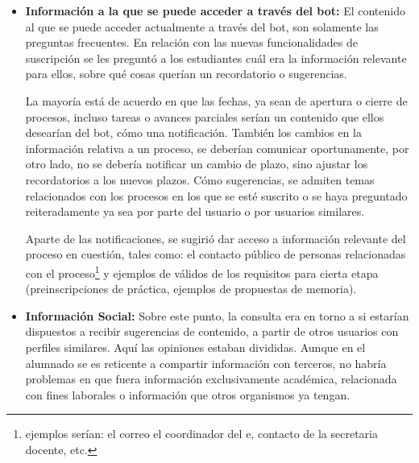    \begin{itemize}
        \item \textbf{Información a la que se puede acceder a través del bot:} El contenido al que se puede acceder actualmente a través del bot, son solamente las preguntas frecuentes. En relación con las nuevas funcionalidades de suscripción se les preguntó a los estudiantes cuál era la información relevante para ellos, sobre qué cosas querían un recordatorio o sugerencias.
        \par La mayoría está de acuerdo en que las fechas, ya sean de apertura o cierre de procesos, incluso tareas o avances parciales serían un contenido que ellos desearían del bot, cómo una notificación. También los cambios en la información relativa a un proceso, se deberían comunicar oportunamente, por otro lado, no se debería notificar un cambio de plazo, sino ajustar los recordatorios a los nuevos plazos. Cómo sugerencias, se admiten temas relacionados con los procesos en los que se esté suscrito o se haya preguntado reiteradamente ya sea por parte del usuario o por usuarios \guillemotleft similares\guillemotright.
        \par Aparte de las notificaciones, se sugirió dar acceso a información relevante del proceso en cuestión, tales como: el contacto público de personas relacionadas con el proceso\footnote{ejemplos serían: el correo el coordinador del \acrshort{e}, contacto de la secretaria docente, etc.} y ejemplos de válidos de los requisitos para cierta etapa (preinscripciones de práctica, ejemplos de propuestas de memoria).

        \item \textbf{Información Social:} Sobre este punto, la consulta era en torno a si estarían dispuestos a recibir sugerencias de contenido, a partir de otros usuarios con perfiles similares.
        Aquí las opiniones estaban divididas. Aunque en el alumnado se es reticente a compartir información con terceros, no habría problemas en que fuera información exclusivamente académica, relacionada con fines laborales o información que otros organismos ya tengan.


\end{itemize}
